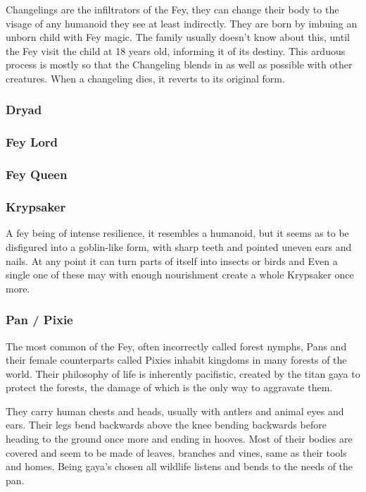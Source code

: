 Changelings are the infiltrators of the Fey, they can change their body
to the visage of any humanoid they see at least indirectly. They are
born by imbuing an unborn child with Fey magic. The family usually
doesn't know about this, until the Fey visit the child at 18 years old,
informing it of its destiny. This arduous process is mostly so that the
Changeling blends in as well as possible with other creatures. When a
changeling dies, it reverts to its original form.

\hypertarget{dryad}{%
\subsubsection{Dryad}\label{dryad}}

\hypertarget{fey-lord}{%
\subsubsection{Fey Lord}\label{fey-lord}}

\hypertarget{fey-queen}{%
\subsubsection{Fey Queen}\label{fey-queen}}

\hypertarget{krypsaker}{%
\subsubsection{Krypsaker}\label{krypsaker}}

A fey being of intense resilience, it resembles a humanoid, but it seems
as to be disfigured into a goblin-like form, with sharp teeth and
pointed uneven ears and nails. At any point it can turn parts of itself
into insects or birds and Even a single one of these may with enough
nourishment create a whole Krypsaker once more.

\hypertarget{pan-pixie}{%
\subsubsection{Pan / Pixie}\label{pan-pixie}}

The most common of the Fey, often incorrectly called forest nymphs, Pans
and their female counterparts called Pixies inhabit kingdoms in many
forests of the world. Their philosophy of life is inherently pacifistic,
created by the titan gaya to protect the forests, the damage of which is
the only way to aggravate them.

They carry human chests and heads, usually with antlers and animal eyes
and ears. Their legs bend backwards above the knee bending backwards
before heading to the ground once more and ending in hooves. Most of
their bodies are covered and seem to be made of leaves, branches and
vines, same as their tools and homes. Being gaya's chosen all wildlife
listens and bends to the needs of the pan.

